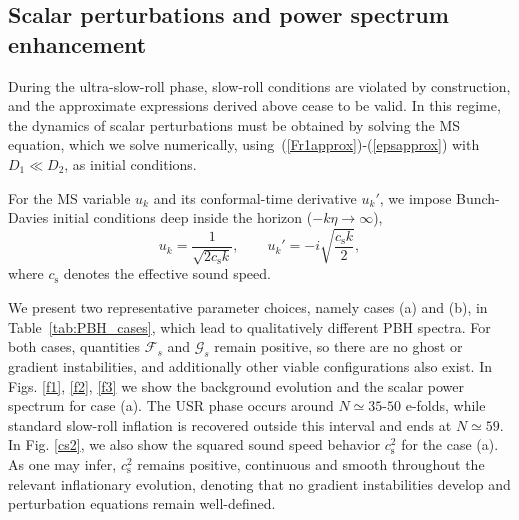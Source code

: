\documentclass[nofootinbib,aps,a4paper,letterpaper,superscriptaddress,
twocolumn,times]{revtex4}
\renewcommand{\(}{\left(}
\renewcommand{\)}{\right)}
\renewcommand{\(}{\left(}
\renewcommand{\)}{\right)}
\renewcommand{\[}{\left[}
\renewcommand{\]}{\right]}
\begin{document}
\subsection{Scalar perturbations and power spectrum enhancement}
\label{subsec:USR_perturbations}

During the ultra-slow-roll phase, slow-roll conditions are violated by 
construction, and the approximate expressions derived above cease to be valid. 
In this regime, the dynamics of scalar perturbations must be obtained by 
solving the MS equation, which we solve numerically, 
using~(\ref{Fr1approx})-(\ref{epsapprox})
with $D_1 \ll D_2$, as initial conditions.

For the MS variable $u_k$ and its conformal-time derivative $u_k'$, we impose 
Bunch-Davies initial conditions deep inside the horizon ($-k\eta \to \infty$),
\begin{equation}
u_k = \frac{1}{\sqrt{2c_\mathrm{s} k}}, \qquad
u_k' = -i \sqrt{\frac{c_\mathrm{s} k}{2}},
\end{equation}
where $c_\mathrm{s}$ denotes the effective sound speed.

We present two representative parameter choices, namely   cases (a) and (b), in 
Table~\ref{tab:PBH_cases}, which lead to qualitatively different PBH spectra. For both cases, quantities $\mathcal{F}_s$ and $\mathcal{G}_s$ remain positive, so there are no ghost or gradient instabilities, and additionally other viable configurations also
exist. In Figs.  \ref{f1}, 
\ref{f2}, \ref{f3} we show the background 
evolution and the scalar power spectrum for case (a). The USR phase occurs around 
$N\simeq 35$-$50$ e-folds, while standard slow-roll inflation is recovered 
outside this interval and ends at $N\simeq 59$. In Fig. \ref{cs2}, we also show the squared sound speed behavior $c_\mathrm{s}^2$ for the case (a). As one may infer, $c_\mathrm{s}^2$ remains positive, continuous and smooth throughout the relevant inflationary evolution, denoting that no gradient instabilities develop and perturbation equations remain well-defined.
\end{document}
